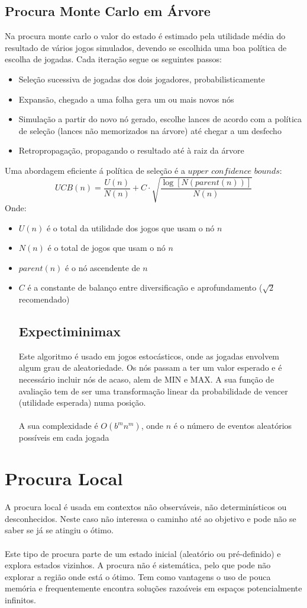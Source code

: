 \documentclass[10pt,a4paper]{report}
\begin{document}
\subsection{Procura Monte Carlo em Árvore}
Na procura monte carlo o valor do estado é estimado pela utilidade média do resultado de vários jogos simulados, devendo se escolhida uma boa política de escolha de jogadas. Cada iteração segue os seguintes passos:
\begin{itemize}
\item Seleção sucessiva de jogadas dos dois jogadores, probabilisticamente
\item Expansão, chegado a uma folha gera um ou mais novos nós
\item Simulação a partir do novo nó gerado, escolhe lances de acordo com a política de seleção (lances não memorizados na árvore) até chegar a um desfecho
\item Retropropagação, propagando o resultado até à raiz da árvore
\end{itemize}
Uma abordagem eficiente á política de seleção é a $upper$ $confidence$ $bounds$:
$$
UCB(n) = \frac{U(n)}{N(n)} + C \cdot \sqrt{\frac{\log[N(parent(n))]}{N(n)}}
$$
Onde:
\begin{itemize}
\item $U(n)$ é o total da utilidade dos jogos que usam o nó $n$
\item $N(n)$ é o total de jogos que usam o nó $n$
\item $parent(n)$ é o nó ascendente de $n$
\item $C$ é a constante de balanço entre diversificação e aprofundamento ($\sqrt{2}$ recomendado)
\subsection{Expectiminimax}
Este algoritmo é usado em jogos estocásticos, onde as jogadas envolvem algum grau de aleatoriedade. Os nós passam a ter um valor esperado e é necessário incluir nós de acaso, alem de MIN e MAX. A sua função de avaliação tem de ser uma transformação linear da probabilidade de vencer (utilidade esperada) numa posição.\\
\\
A sua complexidade é $O(b^mn^m)$, onde $n$ é o número de eventos aleatórios possíveis em cada jogada
\end{itemize}
\section{Procura Local}
A procura local é usada em contextos não observáveis, não determinísticos ou desconhecidos. Neste caso não interessa o caminho até ao objetivo e pode não se saber se já se atingiu o ótimo.\\
\\
Este tipo de procura parte de um estado inicial (aleatório ou pré-definido) e explora estados vizinhos. A procura não é sistemática, pelo que pode não explorar a região onde está o ótimo. Tem como vantagens o uso de pouca memória e frequentemente encontra soluções razoáveis em espaços potencialmente infinitos.
\end{document}
